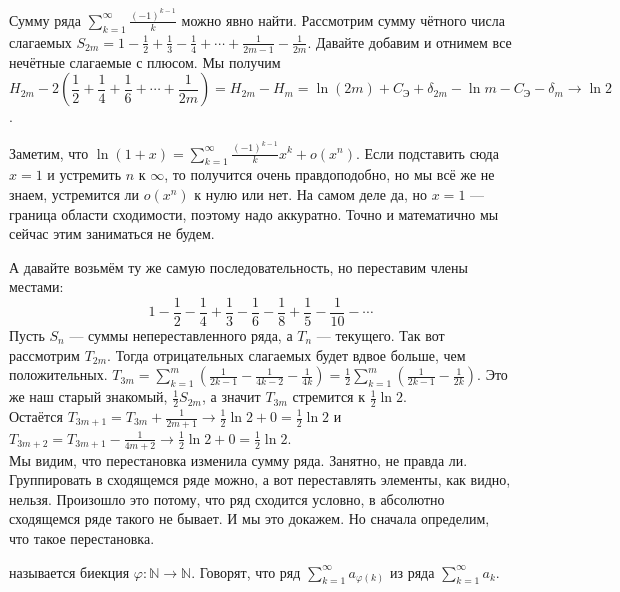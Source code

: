 \documentclass{article}
\begin{document}
\begin{itemize}
        \begin{Example}
            Сумму ряда $\sum\limits_{k=1}^\infty\frac{(-1)^{k-1}}k$ можно явно найти. Рассмотрим сумму чётного числа слагаемых $S_{2m}=1-\frac12+\frac13-\frac14+\cdots+\frac1{2m-1}-\frac1{2m}$. Давайте добавим и отнимем все нечётные слагаемые с плюсом. Мы получим
            $$
            H_{2m}-2\left(\frac12+\frac14+\frac16+\cdots+\frac1{2m}\right)=H_{2m}-H_m=\ln(2m)+C_{\text{Э}}+\delta_{2m}-\ln m-C_{\text{Э}}-\delta_m\rightarrow\ln 2
            $$.
        \end{Example}
        \begin{Comment}
            Заметим, что $\ln(1+x)=\sum\limits_{k=1}^\infty\frac{(-1)^{k-1}}kx^k+o(x^n)$. Если подставить сюда $x=1$ и устремить $n$ к $\infty$, то получится очень правдоподобно, но мы всё же не знаем, устремится ли $o(x^n)$ к нулю или нет. На самом деле да, но $x=1$ --- граница области сходимости, поэтому надо аккуратно. Точно и математично мы сейчас этим заниматься не будем.
        \end{Comment}
        \begin{Example}
            А давайте возьмём ту же самую последовательность, но переставим члены местами:
            $$
            1-\frac12-\frac14+\frac13-\frac16-\frac18+\frac15-\frac1{10}-\cdots
            $$
            Пусть $S_n$ --- суммы непереставленного ряда, а $T_n$ --- текущего. Так вот рассмотрим $T_{2m}$. Тогда отрицательных слагаемых будет вдвое больше, чем положительных. $T_{3m}=\sum\limits_{k=1}^m\left(\frac1{2k-1}-\frac1{4k-2}-\frac1{4k}\right)=\frac12\sum\limits_{k=1}^m\left(\frac1{2k-1}-\frac1{2k}\right)$. Это же наш старый знакомый, $\frac12S_{2m}$, а значит $T_{3m}$ стремится к $\frac12\ln 2$.\\
            Остаётся $T_{3m+1}=T_{3m}+\frac1{2m+1}\rightarrow\frac12\ln 2+0=\frac12\ln 2$ и $T_{3m+2}=T_{3m+1}-\frac1{4m+2}\rightarrow\frac12\ln 2+0=\frac12\ln 2$.\\
            Мы видим, что перестановка изменила сумму ряда. Занятно, не правда ли. Группировать в сходящемся ряде можно, а вот переставлять элементы, как видно, нельзя. Произошло это потому, что ряд сходится условно, в абсолютно сходящемся ряде такого не бывает. И мы это докажем. Но сначала определим, что такое перестановка.
        \end{Example}
        \dfn {} называется биекция $\varphi\colon\mathbb N\to\mathbb N$. Говорят, что ряд $\sum\limits_{k=1}^\infty a_{\varphi(k)}$  из ряда $\sum\limits_{k=1}^\infty a_k$.

\end{itemize}
\end{document}

